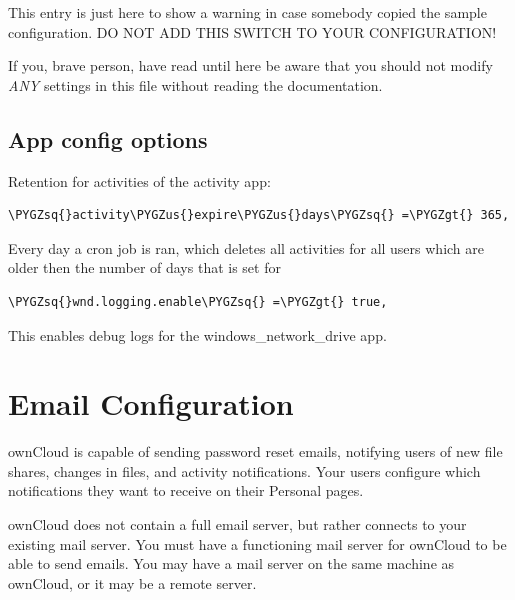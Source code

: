 \documentclass[letterpaper,10pt,english]{sphinxmanual}
\def\PYGZus{\char`\_}
\def\PYGZgt{\char`\>}
\def\PYGZsq{\char`\'}
\begin{document}
This entry is just here to show a warning in case somebody copied the sample
configuration. DO NOT ADD THIS SWITCH TO YOUR CONFIGURATION!

If you, brave person, have read until here be aware that you should not
modify \emph{ANY} settings in this file without reading the documentation.


\subsection{App config options}
\label{configuration_server/config_sample_php_parameters:app-config-options}
Retention for activities of the activity app:

\begin{Verbatim}[commandchars=\\\{\}]
\PYGZsq{}activity\PYGZus{}expire\PYGZus{}days\PYGZsq{} =\PYGZgt{} 365,
\end{Verbatim}

Every day a cron job is ran, which deletes all activities for all users
which are older then the number of days that is set for 

\begin{Verbatim}[commandchars=\\\{\}]
\PYGZsq{}wnd.logging.enable\PYGZsq{} =\PYGZgt{} true,
\end{Verbatim}

This enables debug logs for the windows\_network\_drive app.


\section{Email Configuration}
\label{configuration_server/email_configuration::doc}\label{configuration_server/email_configuration:email-configuration}
ownCloud is capable of sending password reset emails, notifying users of new
file shares, changes in files, and activity notifications. Your users configure
which notifications they want to receive on their Personal pages.

ownCloud does not contain a full email server, but rather connects to your
existing mail server. You must have a functioning mail server for ownCloud to be
able to send emails. You may have a mail server on the same machine as ownCloud,
or it may be a remote server.
\end{document}
